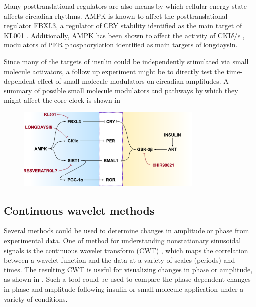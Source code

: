 Many posttranslational regulators are also means by which cellular energy state affects circadian rhythms.
AMPK is known to affect the posttranslational regulator FBXL3, a regulator of CRY stability identified as the main target of KL001 \cite{Lamia2009}.
Additionally, AMPK has been shown to affect the activity of CKI$\delta/\epsilon$ \cite{Lee2013}, modulators of PER phosphorylation identified as main targets of longdaysin.

Since many of the targets of insulin could be independently stimulated via small molecule activators, a follow up experiment might be to directly test the time-dependent effect of small molecule modulators on circadian amplitudes.
A summary of possible small molecule modulators and pathways by which they might affect the core clock is shown in 

\begin{figure}[tbp]
  \centering
  \includegraphics[width=0.8\textwidth]{chap7/figures/connectivity.pdf}
  \label{fig:small-molecule}
\end{figure}

\subsection{Continuous wavelet methods}\label{sec:cwt}

Several methods could be used to determine changes in amplitude or phase from experimental data.
One of method for understanding nonstationary sinusoidal signals is the continuous wavelet transform (CWT) \cite{Torrence1998}, which maps the correlation between a wavelet function and the data at a variety of scales (periods) and times.
The resulting CWT is useful for visualizing changes in phase or amplitude, as shown in .
Such a tool could be used to compare the phase-dependent changes in phase and amplitude following insulin or small molecule application under a variety of conditions.

